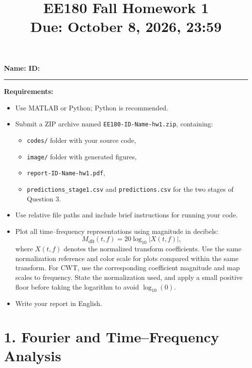 \documentclass[11pt,a4paper]{article}
\title{{\Large\textbf{EE180 Fall Homework 1}} \\[4pt]
{\large\textbf{Due: October 8, 2026, 23:59}}}
\date{}
\begin{document}
\maketitle

\begin{center}
\textbf{Name:\quad\underline{\hspace{4cm}}\quad
ID:\quad\underline{\hspace{4cm}}}
\end{center}
\vspace{0.5em}
\noindent\rule{\textwidth}{0.4pt}

\noindent\textbf{Requirements:}
\begin{itemize}[leftmargin=1.5em]
    \item Use MATLAB or Python; Python is recommended.
    \item Submit a ZIP archive named \texttt{EE180-ID-Name-hw1.zip}, containing:
    \begin{itemize}
        \item \texttt{codes/} folder with your source code,
        \item \texttt{image/} folder with generated figures,
        \item \texttt{report-ID-Name-hw1.pdf},
        \item \texttt{predictions\_stage1.csv} and \texttt{predictions.csv} for the two stages of Question 3.
    \end{itemize}
    \item Use relative file paths and include brief instructions for running your code.
    \item Plot all time--frequency representations using magnitude in decibels:
    \[
        M_{\mathrm{dB}}(t,f)=20\log_{10}|X(t,f)|,
    \]
    where $X(t,f)$ denotes the normalized transform coefficients. Use the same
    normalization reference and color scale for plots compared within the
    same transform. For CWT, use the corresponding coefficient magnitude
    and map scales to frequency. State the normalization used, and apply a
    small positive floor before taking the logarithm to avoid $\log_{10}(0)$.
    \item Write your report in English.
\end{itemize}

\newpage
\section*{1. Fourier and Time--Frequency Analysis}
\end{document}
